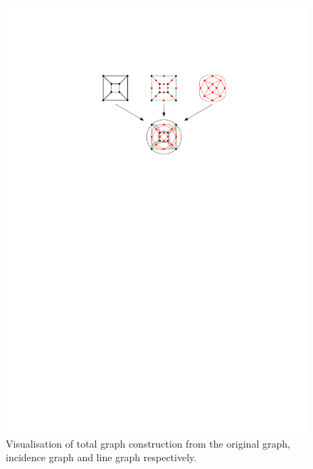 \begin{figure}[H]
    \centering
    \includegraphics[width=1\textwidth]{../Resources/Figs/cubical_total_graph.pdf}
    \caption{Visualisation of total graph construction from the original graph, incidence graph and line graph respectively.}
    \label{fig:cubical_total_graph}
\end{figure}

